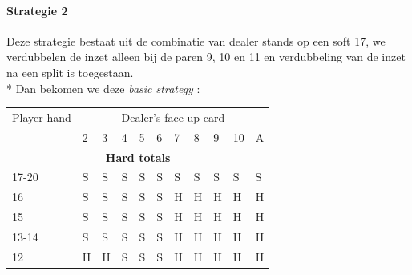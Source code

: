 \documentclass[conference]{IEEEtran}
\begin{document}
\paragraph{Strategie 2}

Deze strategie bestaat uit de combinatie van dealer stands op een soft 17, we verdubbelen de inzet alleen bij de paren 9, 10 en 11 en verdubbeling van de inzet na een split is toegestaan.\\*
Dan bekomen we deze \textit{basic strategy} :

\begin{table}[ht]
\tiny
\centering
\begin{tabular}{|l|l|l|l|l|l|l|l|l|l|l|}
\hline

{Player hand} & \multicolumn{10}{c|}{Dealer's face-up card}     \\ \cline{2-11} 
                             & 2 & 3 & 4 & 5 & 6 & 7 & 8 & 9 & 10 & A \\ \hline \hline
\multicolumn{11}{|c|}{\textbf{Hard totals}}                           \\ \hline
17-20       								 & \cellcolor{red!75}S & \cellcolor{red!75}S & \cellcolor{red!75}S & \cellcolor{red!75}S & \cellcolor{red!75}S & \cellcolor{red!75}S & \cellcolor{red!75}S & \cellcolor{red!75}S & \cellcolor{red!75}S & \cellcolor{red!75}S  \\ \hline
16                           & \cellcolor{red!75}S & \cellcolor{red!75}S & \cellcolor{red!75}S & \cellcolor{red!75}S & \cellcolor{red!75}S & \cellcolor{green!50}H & \cellcolor{green!50}H & \cellcolor{green!50}H & \cellcolor{green!50}H & \cellcolor{green!50}H  \\ \hline
15                           & \cellcolor{red!75}S & \cellcolor{red!75}S & \cellcolor{red!75}S & \cellcolor{red!75}S & \cellcolor{red!75}S & \cellcolor{green!50}H & \cellcolor{green!50}H & \cellcolor{green!50}H & \cellcolor{green!50}H & \cellcolor{green!50}H  \\ \hline
13-14                        & \cellcolor{red!75}S & \cellcolor{red!75}S & \cellcolor{red!75}S & \cellcolor{red!75}S & \cellcolor{red!75}S & \cellcolor{green!50}H & \cellcolor{green!50}H & \cellcolor{green!50}H & \cellcolor{green!50}H & \cellcolor{green!50}H  \\ \hline
12                           & \cellcolor{green!50}H & \cellcolor{green!50}H & \cellcolor{red!75}S & \cellcolor{red!75}S & \cellcolor{red!75}S & \cellcolor{green!50}H & \cellcolor{green!50}H & \cellcolor{green!50}H & \cellcolor{green!50}H & \cellcolor{green!50}H  \\ \hline

\end{tabular}
\end{table}
\end{document}
